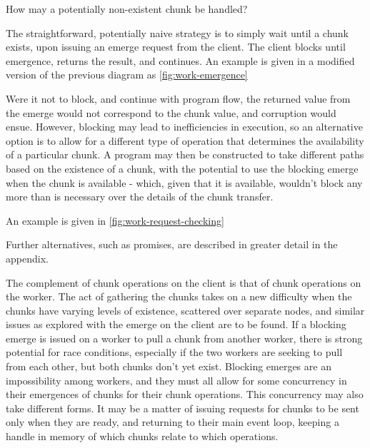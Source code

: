 How may a potentially non-existent chunk be handled?

The straightforward, potentially naive strategy is to simply wait until
a chunk exists, upon issuing an emerge request from the client. The
client blocks until emergence, returns the result, and continues. An
example is given in a modified version of the previous diagram as \cref{fig:work-emergence}


Were it not to block, and continue with program flow, the returned value
from the emerge would not correspond to the chunk value, and corruption
would ensue. However, blocking may lead to inefficiencies in execution,
so an alternative option is to allow for a different type of operation
that determines the availability of a particular chunk. A program may
then be constructed to take different paths based on the existence of a
chunk, with the potential to use the blocking emerge when the chunk is
available - which, given that it is available, wouldn't block any more
than is necessary over the details of the chunk transfer.

An example is given in \cref{fig:work-request-checking}


Further alternatives, such as promises, are described in greater detail
in the appendix.

The complement of chunk operations on the client is that of chunk
operations on the worker. The act of gathering the chunks takes on a new
difficulty when the chunks have varying levels of existence, scattered
over separate nodes, and similar issues as explored with the emerge on
the client are to be found. If a blocking emerge is issued on a worker
to pull a chunk from another worker, there is strong potential for race
conditions, especially if the two workers are seeking to pull from each
other, but both chunks don't yet exist. Blocking emerges are an
impossibility among workers, and they must all allow for some
concurrency in their emergences of chunks for their chunk operations.
This concurrency may also take different forms. It may be a matter of
issuing requests for chunks to be sent only when they are ready, and
returning to their main event loop, keeping a handle in memory of which
chunks relate to which operations.

